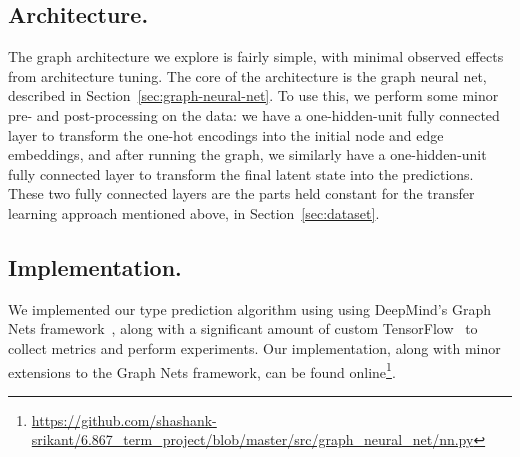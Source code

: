 \subsection{Architecture.}

The graph architecture we explore is fairly simple, with minimal observed effects from architecture tuning.
The core of the architecture is the graph neural net, described in Section~\ref{sec:graph-neural-net}.
To use this, we perform some minor pre- and post-processing on the data: we have a one-hidden-unit fully connected layer to transform the one-hot encodings into the initial node and edge embeddings, and after running the graph, we similarly have a one-hidden-unit fully connected layer to transform the final latent state into the predictions.
These two fully connected layers are the parts held constant for the transfer learning approach mentioned above, in Section~\ref{sec:dataset}.

\subsection{Implementation.}

We implemented our type prediction algorithm using using DeepMind's Graph Nets framework~\cite{deepmind2018graph}, along with a significant amount of custom TensorFlow~\cite{google2015tensorflow} to collect metrics and perform experiments.
Our implementation, along with minor extensions to the Graph Nets framework, can be found online\footnote{\url{https://github.com/shashank-srikant/6.867_term_project/blob/master/src/graph_neural_net/nn.py}}.